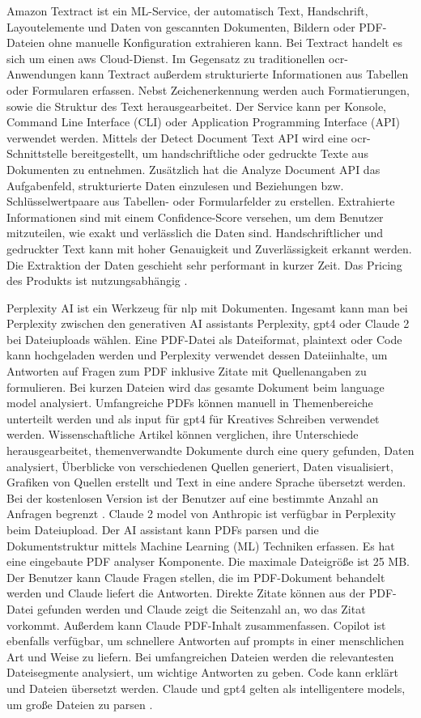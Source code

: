Amazon Textract ist ein ML-Service, der automatisch Text, Handschrift, Layoutelemente und Daten von gescannten Dokumenten, Bildern oder PDF-Dateien ohne manuelle Konfiguration extrahieren kann. Bei Textract handelt es sich um einen \gls{aws} Cloud-Dienst. Im Gegensatz zu traditionellen \gls{ocr}-Anwendungen kann Textract außerdem strukturierte Informationen aus Tabellen oder Formularen erfassen. Nebst Zeichenerkennung werden auch Formatierungen, sowie die Struktur des Text herausgearbeitet. Der Service kann per Konsole, Command Line Interface (CLI) oder Application Programming Interface (API) verwendet werden. Mittels der Detect Document Text API wird eine \gls{ocr}-Schnittstelle bereitgestellt, um handschriftliche oder gedruckte Texte aus Dokumenten zu entnehmen. Zusätzlich hat die Analyze Document API das Aufgabenfeld, strukturierte Daten einzulesen und Beziehungen bzw. Schlüsselwertpaare aus Tabellen- oder Formularfelder zu erstellen. Extrahierte Informationen sind mit einem Confidence-Score versehen, um dem Benutzer mitzuteilen, wie exakt und verlässlich die Daten sind. Handschriftlicher und gedruckter Text kann mit hoher Genauigkeit und Zuverlässigkeit erkannt werden. Die Extraktion der Daten geschieht sehr performant in kurzer Zeit. Das Pricing des Produkts ist nutzungsabhängig \cite{textract}.

Perplexity AI ist ein Werkzeug für \gls{nlp} mit Dokumenten. Ingesamt kann man bei Perplexity zwischen den generativen AI assistants Perplexity, \gls{gpt4} oder Claude 2 bei Dateiuploads wählen. Eine PDF-Datei als Dateiformat, plaintext oder Code kann hochgeladen werden und Perplexity verwendet dessen Dateiinhalte, um Antworten auf Fragen zum PDF inklusive Zitate mit Quellenangaben zu formulieren. Bei kurzen Dateien wird das gesamte Dokument beim language model analysiert. Umfangreiche PDFs können manuell in Themenbereiche unterteilt werden und als input für \gls{gpt4} für Kreatives Schreiben verwendet werden. Wissenschaftliche Artikel können verglichen, ihre Unterschiede herausgearbeitet, themenverwandte Dokumente durch eine query gefunden, Daten analysiert, Überblicke von verschiedenen Quellen generiert, Daten visualisiert, Grafiken von Quellen erstellt und Text in eine andere Sprache übersetzt werden. Bei der kostenlosen Version ist der Benutzer auf eine bestimmte Anzahl an Anfragen begrenzt \cite{hackernoon-claude}. Claude 2 model von Anthropic ist verfügbar in Perplexity beim Dateiupload. Der AI assistant kann PDFs parsen und die Dokumentstruktur mittels Machine Learning (ML) Techniken erfassen. Es hat eine eingebaute PDF analyser Komponente. Die maximale Dateigröße ist 25 MB. Der Benutzer kann Claude Fragen stellen, die im PDF-Dokument behandelt werden und Claude liefert die Antworten. Direkte Zitate können aus der PDF-Datei gefunden werden und Claude zeigt die Seitenzahl an, wo das Zitat vorkommt. Außerdem kann Claude PDF-Inhalt zusammenfassen. Copilot ist ebenfalls verfügbar, um schnellere Antworten auf prompts in einer menschlichen Art und Weise zu liefern. Bei umfangreichen Dateien werden die relevantesten Dateisegmente analysiert, um wichtige Antworten zu geben. Code kann erklärt und Dateien übersetzt werden. Claude und \gls{gpt4} gelten als intelligentere models, um große Dateien zu parsen \cite{perplexity}.

